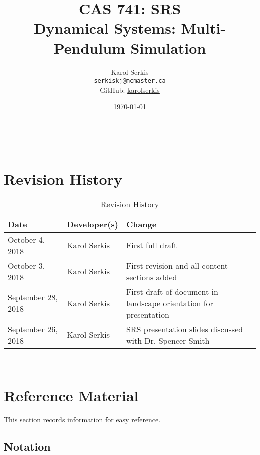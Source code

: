\documentclass[12pt]{article}
\newcommand{\progname}{Multi-Pendulum Simulation }
\begin{document}

\title{CAS 741: SRS\\[10pt]\Large Dynamical Systems: \progname}
\author{Karol Serkis\\\texttt{serkiskj@mcmaster.ca}\\GitHub:
\href{https://www.github.com/karolserkis}{karolserkis}}
\date{\today}
	
\maketitle

~\newpage

\tableofcontents

\clearpage

\setcounter{secnumdepth}{0}

\section{Revision History}

\begin{table}[hp]
\caption{Revision History}
\begin{tabularx}{\textwidth}{llX}
\toprule
\textbf{Date} & \textbf{Developer(s)} & \textbf{Change}\\
\midrule
October 4, 2018 & Karol Serkis &  First full draft\\
October 3, 2018 & Karol Serkis & First revision and all content sections added\\September 28, 2018 & 
Karol Serkis & First draft of document in landscape
orientation for presentation\\
September 26, 2018 & Karol Serkis & SRS presentation slides discussed with Dr.
Spencer Smith \\
\bottomrule
\end{tabularx}
\end{table}

~\newpage

\section{Reference Material}

This section records information for easy reference.

\subsection{Notation}
\end{document}
